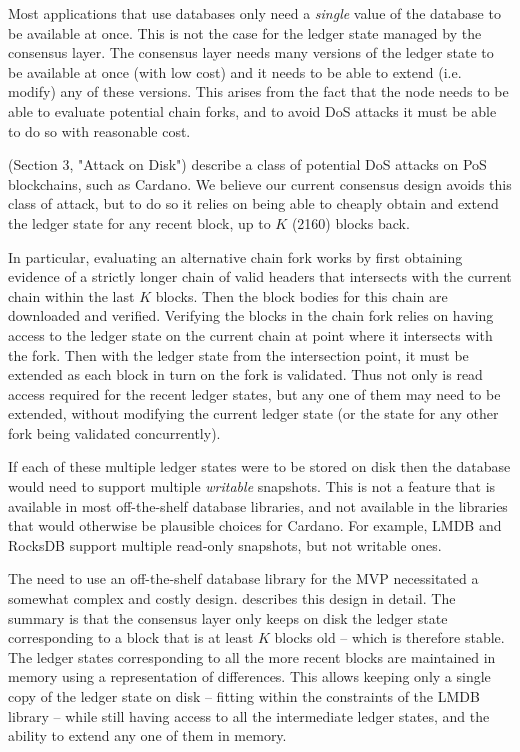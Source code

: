 \documentclass[11pt,a4paper]{article}
\begin{document}
Most applications that use databases only need a \emph{single} value of the
database to be available at once. This is not the case for the ledger state
managed by the consensus layer. The consensus layer needs many versions of the
ledger state to be available at once (with low cost) and it needs to be able to
extend (i.e. modify) any of these versions. This arises from the fact that the
node needs to be able to evaluate potential chain forks, and to avoid DoS
attacks it must be able to do so with reasonable cost.

\cite{fake-stake} (Section 3, "Attack on Disk") describe a class of potential
DoS attacks on PoS blockchains, such as Cardano. We believe our current
consensus design avoids this class of attack, but to do so it relies on being
able to cheaply obtain and extend the ledger state for any recent block, up to
$K$ (2160) blocks back.

In particular, evaluating an alternative chain fork works by first obtaining
evidence of a strictly longer chain of valid headers that intersects with the
current chain within the last $K$ blocks. Then the block bodies for this chain
are downloaded and verified. Verifying the blocks in the chain fork relies on
having access to the ledger state on the current chain at point where it
intersects with the fork. Then with the ledger state from the intersection
point, it must be extended as each block in turn on the fork is validated. Thus
not only is read access required for the recent ledger states, but any one of
them may need to be extended, without modifying the current ledger state (or
the state for any other fork being validated concurrently).

If each of these multiple ledger states were to be stored on disk then the
database would need to support multiple \emph{writable} snapshots. This is not
a feature that is available in most off-the-shelf database libraries, and not
available in the libraries that would otherwise be plausible choices for
Cardano. For example, LMDB and RocksDB support multiple read-only snapshots,
but not writable ones.

The need to use an off-the-shelf database library for the MVP necessitated a
somewhat complex and costly design. \cite{utxo-db-api} describes this design in
detail. The summary is that the consensus layer only keeps on disk the ledger
state corresponding to a block that is at least $K$ blocks old -- which is
therefore stable. The ledger states corresponding to all the more recent blocks
are maintained in memory using a representation of differences. This allows
keeping only a single copy of the ledger state on disk -- fitting within the
constraints of the LMDB library -- while still having access to all the
intermediate ledger states, and the ability to extend any one of them in memory.
\end{document}
